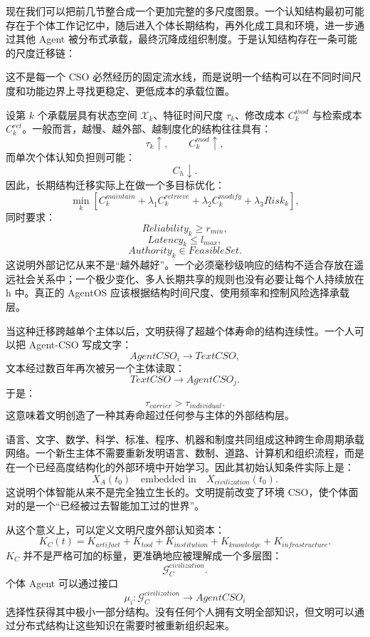 现在我们可以把前几节整合成一个更加完整的多尺度图景。一个认知结构最初可能存在于个体工作记忆中，随后进入个体长期结构，再外化成工具和环境，进一步通过其他 Agent 被分布式承载，最终沉降成组织制度。于是认知结构存在一条可能的尺度迁移链：
\begin{statementbox}
\centering
{}
\end{statementbox}
这不是每一个 CSO 必然经历的固定流水线，而是说明一个结构可以在不同时间尺度和功能边界上寻找更稳定、更低成本的承载位置。

设第 $k$ 个承载层具有状态空间 $\mathcal X_k$、特征时间尺度 $\tau_k$、修改成本 $C_k^{mod}$ 与检索成本 $C_k^{ret}$。一般而言，越慢、越外部、越制度化的结构往往具有：
\[
\tau_k\uparrow,
\qquad
C_k^{mod}\uparrow,
\]
而单次个体认知负担则可能：
\[
C_h\downarrow.
\]
因此，长期结构迁移实际上在做一个多目标优化：
\[
\min_{k}
\left[
C_k^{maintain}
+
\lambda_1 C_k^{retrieve}
+
\lambda_2 C_k^{modify}
+
\lambda_3 Risk_k
\right],
\]
同时要求：
\[
Reliability_k\geq r_{min},
\]
\[
Latency_k\leq l_{max},
\]
\[
Authority_k\in FeasibleSet.
\]
这说明外部记忆从来不是``越外越好''。一个必须毫秒级响应的结构不适合存放在遥远社会关系中；一个极少变化、多人长期共享的规则也没有必要让每个人持续放在 h 中。真正的 AgentOS 应该根据结构时间尺度、使用频率和控制风险选择承载层。

当这种迁移跨越单个主体以后，文明获得了超越个体寿命的结构连续性。一个人可以把 Agent-CSO 写成文字：
\[
AgentCSO_i
\rightarrow
TextCSO,
\]
文本经过数百年再次被另一个主体读取：
\[
TextCSO
\rightarrow
AgentCSO_j.
\]
于是：
\[
\tau_{carrier}
>
\tau_{individual}.
\]
这意味着文明创造了一种其寿命超过任何参与主体的外部结构层。

语言、文字、数学、科学、标准、程序、机器和制度共同组成这种跨生命周期承载网络。一个新生主体不需要重新发明语言、数制、道路、计算机和组织流程，而是在一个已经高度结构化的外部环境中开始学习。因此其初始认知条件实际上是：
\[
X_A(t_0)
\quad\text{embedded in}\quad
X_{civilization}(t_0).
\]
这说明个体智能从来不是完全独立生长的。文明提前改变了环境 CSO，使个体面对的是一个``已经被过去智能加工过的世界''。

从这个意义上，可以定义文明尺度外部认知资本：
\[
K_C(t)
=
K_{artifact}
+
K_{tool}
+
K_{institution}
+
K_{knowledge}
+
K_{infrastructure}.
\]
$K_C$ 并不是严格可加的标量，更准确地应被理解成一个多层图：
\[
\mathcal G_C^{civilization}.
\]
个体 Agent 可以通过接口
\[
\mu_i:
\mathcal G_C^{civilization}
\rightarrow
AgentCSO_i
\]
选择性获得其中极小一部分结构。没有任何个人拥有文明全部知识，但文明可以通过分布式结构让这些知识在需要时被重新组织起来。

